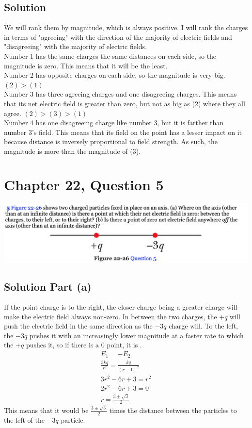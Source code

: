 \documentclass[12pt]{article}
\begin{document}
\subsection*{Solution}
We will rank them by magnitude, which is always positive. I will rank the charges in terms of "agreeing" with the direction of the majority of electric fields and "disagreeing" with the majority of electric fields.\\
Number 1 has the same charges the same distances on each side, so the magnitude is zero. This means that it will be the least.\\
Number 2 has opposite charges on each side, so the magnitude is very big. $(2) > (1)$\\
Number 3 has three agreeing charges and one disagreeing charges. This means that its net electric field is greater than zero, but not as big as (2) where they all agree. $(2) > (3) > (1)$\\
Number 4 has one disagreeing charge like number 3, but it is farther than number 3's field. This means that its field on the point has a lesser impact on it because distance is inversely proportional to field strength. As such, the magnitude is more than the magnitude of (3). 


\pagebreak
\section*{Chapter 22, Question 5}
\includegraphics[width=\textwidth]{picture_4.png}

\subsection*{Solution Part (a)}
If the point charge is to the right, the closer charge being a greater charge will make the electric field always non-zero. In between the two charges, the $+q$ will push the electric field in the same direction as the $-3q$ charge will. To the left, the $-3q$ pushes it with an increasingly lower magnitude at a faster rate to which the $+q$ pushes it, so if there is a 0 point, it is .
\begin{gather*}
    E_1 = -E_2\\
    \frac{3kq}{r^2} = \frac{kq}{(r - 1)^2}\\
    3r^2 - 6r + 3 = r^2\\
    2r^2 - 6r + 3 = 0\\
    r = \frac{3 \pm \sqrt{3}}{2}
\end{gather*}
This means that it would be $\frac{3 \pm \sqrt{3}}{2}$ times the distance between the particles to the left of the $-3q$ particle.
\end{document}
